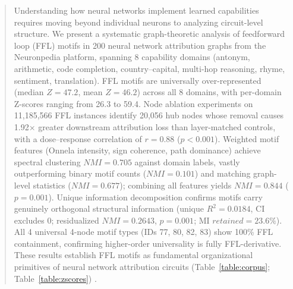 \begin{abstract}
Understanding how neural networks implement learned capabilities requires moving beyond individual neurons to analyzing circuit-level structure. We present a systematic graph-theoretic analysis of feedforward loop (FFL) motifs in 200 neural network attribution graphs from the Neuronpedia platform, spanning 8 capability domains (antonym, arithmetic, code completion, country--capital, multi-hop reasoning, rhyme, sentiment, translation). FFL motifs are universally over-represented (median $Z=47.2$, mean $Z=46.2$) across all 8 domains, with per-domain Z-scores ranging from 26.3 to 59.4. Node ablation experiments on 11,185,566 FFL instances identify 20,056 hub nodes whose removal causes 1.92$\times$ greater downstream attribution loss than layer-matched controls, with a dose--response correlation of $r=0.88$ ($p<0.001$). Weighted motif features (Onnela intensity, sign coherence, path dominance) achieve spectral clustering $NMI=0.705$ against domain labels, vastly outperforming binary motif counts ($NMI=0.101$) and matching graph-level statistics ($NMI=0.677$); combining all features yields $NMI=0.844$ ($p=0.001$). Unique information decomposition confirms motifs carry genuinely orthogonal structural information (unique $R^2=0.0184$, CI excludes 0; residualized $NMI=0.2643$, $p=0.001$; MI $retained=23.6\%$). All 4 universal 4-node motif types (IDs 77, 80, 82, 83) show 100\% FFL containment, confirming higher-order universality is fully FFL-derivative. These results establish FFL motifs as fundamental organizational primitives of neural network attribution circuits (Table~\ref{table:corpus}; Table~\ref{table:zscores}) \cite{conmy2023automated, marks2024sparse}.
\end{abstract}